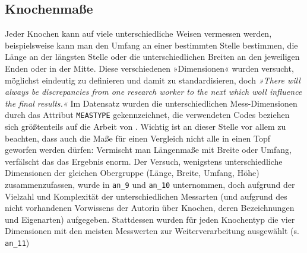 \subsection{Knochenmaße}

Jeder Knochen kann auf viele unterschiedliche Weisen vermessen werden, beispielsweise kann man den Umfang an einer bestimmten Stelle bestimmen, die Länge an der längsten Stelle oder die unterschiedlichen Breiten an den jeweiligen Enden oder in der Mitte. 
Diese verschiedenen »Dimensionen« wurden versucht, möglichst eindeutig zu definieren und damit zu standardisieren, doch \textit{»There will always be discrepancies from one research worker to the next which woll influence the final results.«} \cite{Levine1981}
Im Datensatz wurden die unterschiedlichen Mess-Dimensionen durch das Attribut \texttt{MEASTYPE} gekennzeichnet, die verwendeten Codes beziehen sich größtenteils auf die Arbeit von \cite{Levine1981}.
Wichtig ist an dieser Stelle vor allem zu beachten, dass auch die Maße für einen Vergleich nicht alle in einen Topf geworfen werden dürfen: Vermischt man Längenmaße mit Breite oder Umfang, verfälscht das das Ergebnis enorm.
Der Versuch, wenigstens unterschiedliche Dimensionen der gleichen Obergruppe (Länge, Breite, Umfang, Höhe) zusammenzufassen, wurde in \texttt{an\_9} und \texttt{an\_10} unternommen, doch aufgrund der Vielzahl und Komplexität der unterschiedlichen Messarten (und aufgrund des nicht vorhandenen Vorwissens der Autorin über Knochen, deren Bezeichnungen und Eigenarten) aufgegeben. 
Stattdessen wurden für jeden Knochentyp die vier Dimensionen mit den meisten Messwerten zur Weiterverarbeitung ausgewählt (s. \texttt{an\_11})